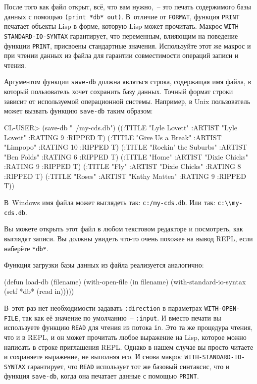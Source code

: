 После того как файл открыт, всё, что вам нужно,~-- это печать содержимого базы данных с
помощью \lstinline{(print *db* out)}. В~отличие от \lstinline{FORMAT}, функция \lstinline{PRINT}
печатает объекты Lisp в форме, которую Lisp может прочитать. Макрос
\lstinline{WITH-STANDARD-IO-SYNTAX} гарантирует, что переменным, влияющим на поведение
функции \lstinline{PRINT}, присвоены стандартные значения. Используйте этот же макрос и при
чтении данных из файла для гарантии совместимости операций записи и чтения.

Аргументом функции \lstinline{save-db} должна являться строка, содержащая имя файла, в который
пользователь хочет сохранить базу данных. Точный формат строки зависит от используемой
операционной системы. Например, в Unix пользователь может вызвать функцию \lstinline{save-db}
таким образом:

\begin{myverb}
CL-USER> (save-db "~/my-cds.db")
((:TITLE "Lyle Lovett" :ARTIST "Lyle Lovett" :RATING 9 :RIPPED T)
 (:TITLE "Give Us a Break" :ARTIST "Limpopo" :RATING 10 :RIPPED T)
 (:TITLE "Rockin' the Suburbs" :ARTIST "Ben Folds" :RATING 6 :RIPPED T)
 (:TITLE "Home" :ARTIST "Dixie Chicks" :RATING 9 :RIPPED T)
 (:TITLE "Fly" :ARTIST "Dixie Chicks" :RATING 8 :RIPPED T)
 (:TITLE "Roses" :ARTIST "Kathy Mattea" :RATING 9 :RIPPED T))
\end{myverb}

В~Windows имя файла может выглядеть так: \lstinline!c:/my-cds.db!. Или так:
\lstinline!c:\\my-cds.db!.

Вы можете открыть этот файл в любом текстовом редакторе и посмотреть, как выглядят
записи. Вы должны увидеть что-то очень похожее на вывод REPL, если наберёте \lstinline{*db*}.

Функция загрузки базы данных из файла реализуется аналогично:

\begin{myverb}
(defun load-db (filename)
  (with-open-file (in filename)
    (with-standard-io-syntax
      (setf *db* (read in)))))
\end{myverb}

В~этот раз нет необходимости задавать \lstinline{:direction} в параметрах
\lstinline{WITH-OPEN-FILE}, так как её значение по умолчанию~-- \lstinline{:input}. И вместо
печати вы используете функцию \lstinline{READ} для чтения из потока \lstinline{in}. Это та же
процедура чтения, что и в REPL, и он может прочитать любое выражение на Lisp, которое
можно написать в строке приглашения REPL. Однако в нашем случае вы просто читаете и
сохраняете выражение, не выполняя его. И снова макрос \lstinline{WITH-STANDARD-IO-SYNTAX}
гарантирует, что \lstinline{READ} использует тот же базовый синтаксис, что и функция
\lstinline{save-db}, когда она печатает данные с помощью \lstinline{PRINT}.

